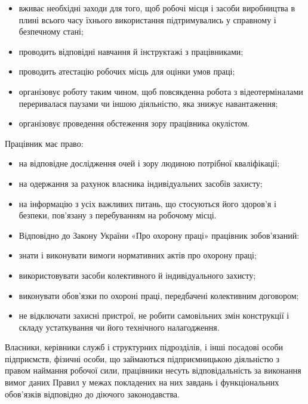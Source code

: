 \documentclass[simple,a4paper,14pt,ukrainian,utf8]{eskdtext}
\begin{document}
\begin{appendices}
                \begin{itemize}
                    \item вживає необхідні заходи для того, щоб робочі місця і засоби виробництва в плині всього часу їхнього використання підтримувались у справному і безпечному стані;
                    \item проводить відповідні навчання й інструктажі з працівниками;
                    \item проводить атестацію робочих місць для оцінки умов праці;
                    \item організовує роботу таким чином, щоб повсякденна робота з відеотерміналами переривалася паузами чи іншою діяльністю, яка знижує навантаження;
                    \item організовує проведення обстеження зору працівника окулістом.
                \end{itemize}

                Працівник має право:

                \begin{itemize}
                    \item на відповідне дослідження очей і зору людиною потрібної кваліфікації;
                    \item на одержання за рахунок власника індивідуальних засобів захисту;
                    \item на інформацію з усіх важливих питань, що стосуються його здоров'я і безпеки, пов'язану з перебуванням на робочому місці.
                    \item Відповідно до Закону України «Про охорону праці» працівник зобов'язаний:
                    \item знати і виконувати вимоги нормативних актів про охорону праці;
                    \item використовувати засоби колективного й індивідуального захисту;
                    \item виконувати обов'язки по охороні праці, передбачені колективним договором;
                    \item не відключати захисні пристрої, не робити самовільних змін конструкції і складу устаткування чи його технічного налагодження.
                \end{itemize}

                Власники, керівники служб і структурних підрозділів, і інші посадові особи підприємств, фізичні особи, що займаються підприємницькою діяльністю з правом наймання робочої сили, працівники несуть відповідальність за виконання вимог даних Правил у межах покладених на них завдань і функціональних обов'язків відповідно до діючого законодавства.


\end{appendices}
\end{document}
